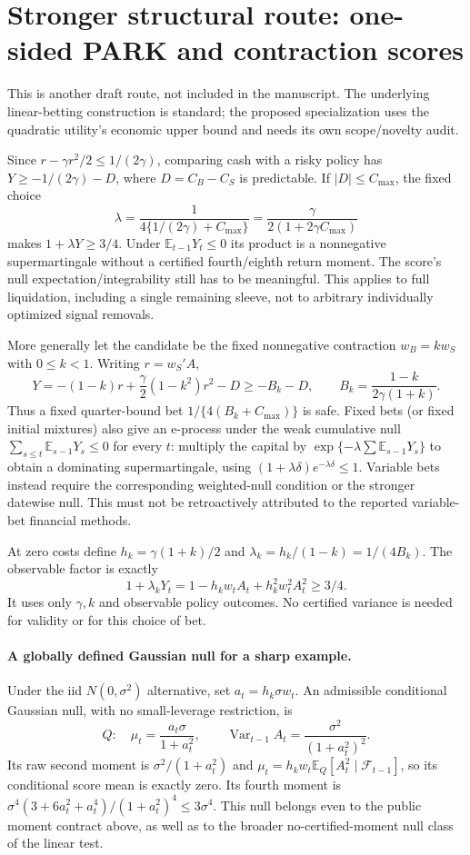 \section*{Stronger structural route: one-sided PARK and contraction scores}
This is another draft route, not included in the manuscript. The underlying
linear-betting construction is standard; the proposed specialization uses the
quadratic utility's economic upper bound and needs its own scope/novelty audit.

Since $r-\gamma r^2/2\le1/(2\gamma)$, comparing cash with a risky policy has
$Y\ge-1/(2\gamma)-D$, where $D=C_B-C_S$ is predictable. If
$|D|\le C_{\max}$, the fixed choice
\[
 \lambda=\frac1{4\{1/(2\gamma)+C_{\max}\}}
         =\frac{\gamma}{2(1+2\gamma C_{\max})}
\]
makes $1+\lambda Y\ge3/4$. Under $\mathbb E_{t-1}Y_t\le0$ its product is
a nonnegative supermartingale without a certified fourth/eighth return
moment. The score's null expectation/integrability still has to be meaningful.
This applies to full liquidation, including a single remaining sleeve, not
to arbitrary individually optimized signal removals.

More generally let the candidate be the fixed nonnegative contraction
$w_B=k w_S$ with $0\le k<1$. Writing $r=w_S'A$,
\[
 Y=-(1-k)r+\frac\gamma2(1-k^2)r^2-D
 \ge -B_k-D,\qquad B_k=\frac{1-k}{2\gamma(1+k)}.
\]
Thus a fixed quarter-bound bet $1/\{4(B_k+C_{\max})\}$ is safe. Fixed bets
(or fixed initial mixtures) also give an e-process under the weak cumulative
null $\sum_{s\le t}\mathbb E_{s-1}Y_s\le0$ for every $t$: multiply the capital
by $\exp\{-\lambda\sum\mathbb E_{s-1}Y_s\}$ to obtain a dominating
supermartingale, using $(1+\lambda\delta)e^{-\lambda\delta}\le1$.
Variable bets instead require the corresponding weighted-null condition or
the stronger datewise null. This must not be retroactively attributed to the
reported variable-bet financial methods.

At zero costs define $h_k=\gamma(1+k)/2$ and
$\lambda_k=h_k/(1-k)=1/(4B_k)$. The observable factor is exactly
\[
 1+\lambda_kY_t=1-h_k w_tA_t+h_k^2 w_t^2A_t^2\ge3/4.
\]
It uses only $\gamma,k$ and observable policy outcomes. No certified variance
is needed for validity or for this choice of bet.

\paragraph{A globally defined Gaussian null for a sharp example.}
Under the iid $N(0,\sigma^2)$ alternative, set $a_t=h_k\sigma w_t$.
An admissible conditional Gaussian null, with no small-leverage restriction,
is
\[
 Q:\quad \mu_t=\frac{a_t\sigma}{1+a_t^2},\qquad
 \operatorname{Var}_{t-1}A_t=\frac{\sigma^2}{(1+a_t^2)^2}.
\]
Its raw second moment is $\sigma^2/(1+a_t^2)$ and
$\mu_t=h_kw_t\mathbb E_Q[A_t^2\mid\mathcal F_{t-1}]$, so its conditional
score mean is exactly zero. Its fourth moment is
$\sigma^4(3+6a_t^2+a_t^4)/(1+a_t^2)^4\le3\sigma^4$.
This null belongs even to the public moment contract above, as well as to
the broader no-certified-moment null class of the linear test.


